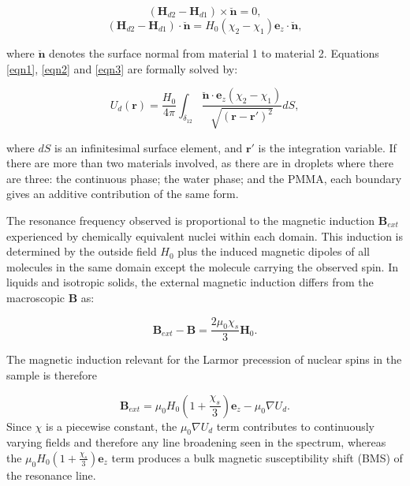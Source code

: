 \begin{equation} \label{eqn2}
  (\mathbf{H}_{d2} - \mathbf{H}_{d1}) \times \breve{\mathbf{n}} = 0,
\end{equation}
\begin{equation} \label{eqn3}
    (\mathbf{H}_{d2} - \mathbf{H}_{d1}) \cdot \breve{\mathbf{n}} = H_{0}(\chi_{2} -
    \chi_{1})\mathbf{e}_{z}\cdot\breve{\mathbf{n}},
\end{equation}

where $\breve{\mathbf{n}}$ denotes the surface normal from material 1 to material 2. Equations \ref{eqn1}, \ref{eqn2}
and \ref{eqn3} are formally solved by:

\begin{equation}\label{eqn:Magnetostatic}
  U_{d}(\mathbf{r}) = \frac{H_{0}}{4\pi}\int_{\delta_{12}}\frac{\breve{\mathbf{n}}\cdot\mathbf{e}_{z}(\chi_{2}-\chi_{1})}{\sqrt{(\mathbf{r}-\mathbf{r'})^{2}}}dS,
\end{equation}

where $dS$ is an infinitesimal surface element, and $\mathbf{r'}$ is the integration variable. If there are more than two materials involved, as there are in droplets where
there are three: the continuous phase; the water phase; and the PMMA, each boundary gives an additive contribution of the same form.

The resonance frequency observed is proportional to the magnetic induction $\mathbf{B}_{ext}$
experienced by chemically equivalent nuclei within each domain. This induction is determined
by the outside field $H_{0}$ plus the induced magnetic dipoles of all molecules in the same domain except the molecule carrying
the observed spin.\citep{Levitt:1996tg} In liquids and isotropic solids, the external magnetic induction differs from the macroscopic $\mathbf{B}$ as:

\begin{equation}
  \mathbf{B}_{ext}-\mathbf{B} = \frac{2\mu_{0}\chi_{s}}{3}\mathbf{H}_{0}.
\end{equation}

The magnetic induction relevant for the Larmor precession of nuclear spins in the sample is therefore

\begin{equation}\label{eqn:LarmorSpins}
  \mathbf{B}_{ext} = \mu_{0}H_{0}(1 + \frac{\chi_{s}}{3})\mathbf{e}_{z} - \mu_{0} \nabla U_{d}.
\end{equation}
Since $\chi$ is a piecewise constant, the $\mu_{0} \nabla U_{d}$ term contributes to continuously varying fields
and therefore any line broadening seen in the spectrum, whereas the $\mu_{0}H_{0}(1 + \frac{\chi_{s}}{3})\mathbf{e}_{z}$
term produces a bulk magnetic susceptibility shift (BMS) of the resonance line.


